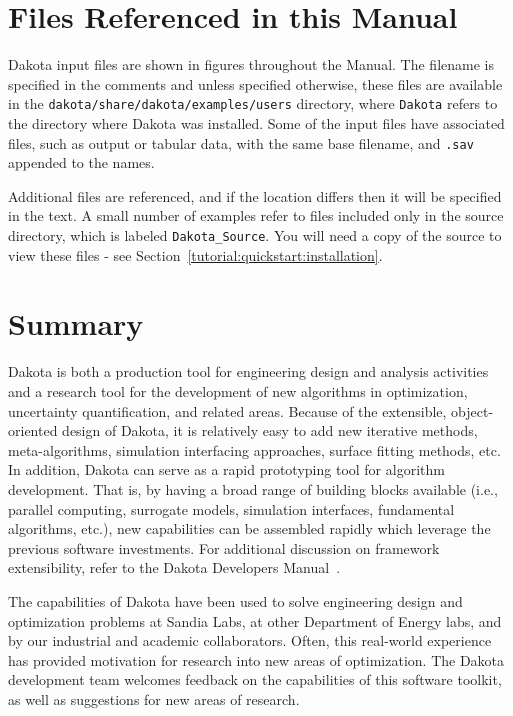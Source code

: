\section{Files Referenced in this Manual}\label{intro:files}
Dakota input files are shown in figures throughout the Manual. 
The filename is specified in the comments
and unless specified otherwise, these
files are available in the {\tt dakota/share/dakota/examples/users} directory,
where {\tt Dakota} refers to the directory where Dakota was installed. Some
of the input files have associated files, such as output or tabular data,
with the same base filename, and {\tt .sav} appended to the names.

Additional files are referenced, and if the location differs then it will
be specified in the text.
A small number of examples refer to files included only in the source
directory, which is labeled {\tt Dakota\_Source}. You will need a copy of
the source to view these files - see Section~\ref{tutorial:quickstart:installation}.

\section{Summary}\label{intro:summary}

Dakota is both a production tool for engineering design and analysis
activities and a research tool for the development of new algorithms
in optimization, uncertainty quantification, and related areas.
Because of the extensible, object-oriented design of Dakota, it is
relatively easy to add new iterative methods, meta-algorithms,
simulation interfacing approaches, surface fitting methods, etc. In
addition, Dakota can serve as a rapid prototyping tool for algorithm
development. That is, by having a broad range of building blocks
available (i.e., parallel computing, surrogate models, simulation
interfaces, fundamental algorithms, etc.), new capabilities can be
assembled rapidly which leverage the previous software investments.
For additional discussion on framework extensibility, refer to the
Dakota Developers Manual~\cite{DevMan}.

The capabilities of Dakota have been used to solve engineering design
and optimization problems at Sandia Labs, at other Department of
Energy labs, and by our industrial and academic collaborators. Often,
this real-world experience has provided motivation for research into
new areas of optimization. The Dakota development team welcomes
feedback on the capabilities of this software toolkit, as well as
suggestions for new areas of research.

